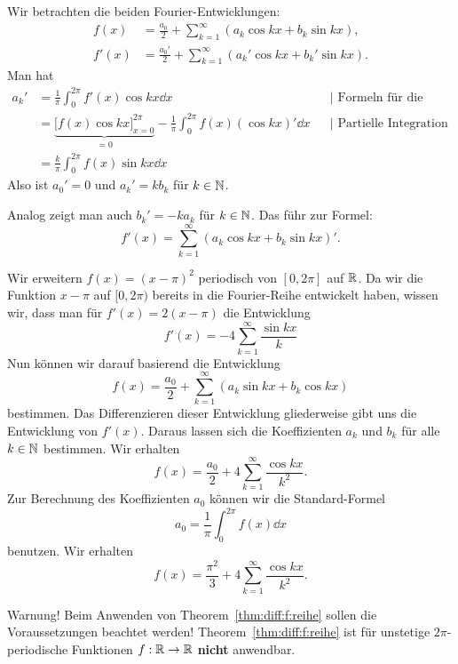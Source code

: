 \begin{bem}[Begründung] 
	Wir betrachten die beiden Fourier-Entwicklungen: 
	\begin{align*}
		f(x) & = \frac{a_0}{2}  + \sum_{k=1}^\infty (a_k \cos k x + b_k \sin k x),
		\\ f'(x) & = \frac{a_0'}{2} + \sum_{k=1}^\infty (a_k' \cos k x + b_k' \sin k x).
	\end{align*} 
	Man hat 
	\begin{align*}
		a_k' & = \frac{1}{\pi} \int_0^{2\pi} f'(x) \cos k x \dd x & & |\text{ Formeln für die Koeffizienten} 
		\\ & = \underbrace{\biggl[ f(x) \cos k x \biggr]_{x=0}^{2 \pi}}_{=0} - \frac{1}{\pi} \int_0^{2 \pi} f(x) (\cos k x)' \dd x & & |\text{ Partielle Integration}
		\\ & = \frac{k}{\pi} \int_0^{2 \pi} f(x) \sin k x \dd x & & 
	\end{align*} 
	Also ist $a_0' = 0$ und $a_k' = k b_k$ für $k \in \mathbb{N}$. 
		
	Analog zeigt man auch $b_k' = -k a_k$ für $k \in \mathbb{N}$. Das führ zur Formel: 
	\[
		f'(x) = \sum_{k=1}^\infty (a_k \cos k x + b_k \sin k x)'. 
	\]
\end{bem} 

\begin{bsp} 
	Wir erweitern $f(x) = (x-\pi)^2 $ periodisch von $[0,2\pi]$ auf $\mathbb{R}$. Da wir die Funktion $x-\pi$ auf $[0,2 \pi)$ bereits in die Fourier-Reihe entwickelt haben, wissen wir, dass man für $f'(x) = 2 (x-\pi)$ die Entwicklung 
	\[
		f'(x)  = - 4 \sum_{k=1}^\infty \frac{\sin k x}{k} 
	\]
	Nun können wir darauf basierend die Entwicklung 
	\[
		f(x) = \frac{a_0}{2} + \sum_{k=1}^\infty (a_k \sin k x  + b_k \cos k x)
	\] 
	bestimmen. Das Differenzieren dieser Entwicklung gliederweise gibt uns die Entwicklung von $f'(x)$. Daraus lassen sich die Koeffizienten $a_k$ und $b_k$ für alle $k \in \mathbb{N}$ bestimmen. Wir erhalten 
	\[
		f(x) = \frac{a_0}{2} + 4 \sum_{k=1}^\infty \frac{\cos k x}{k^2}. 
	\]
	Zur Berechnung des Koeffizienten $a_0$ können wir die Standard-Formel 
	\[
		a_0 = \frac{1}{\pi} \int_0^{2 \pi}	f(x) \dd x
	\]
	benutzen. Wir erhalten
	\[
		f(x) = \frac{\pi^2}{3} + 4 \sum_{k=1}^\infty \frac{ \cos k x}{k^2}. 
	\]
\end{bsp} 

\begin{bem}
	{\color{red} Warnung!} Beim Anwenden von Theorem~\ref{thm:diff:f:reihe} sollen die Voraussetzungen beachtet werden! Theorem~\ref{thm:diff:f:reihe} ist für unstetige $2\pi$-periodische Funktionen $f : \mathbb{R} \to \mathbb{R}$ \textbf{nicht} anwendbar. 
\end{bem} 

